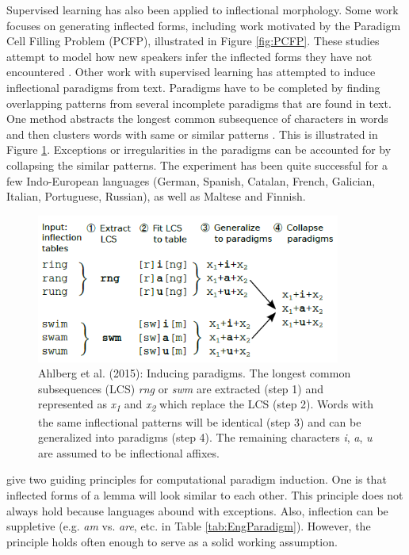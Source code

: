 Supervised learning has also been applied to inflectional morphology. Some work focuses on generating inflected forms, including work motivated by the Paradigm Cell Filling Problem (PCFP), illustrated in Figure \ref{fig:PCFP}. These studies attempt to model how new speakers infer the inflected forms they have not encountered \citep{dreyer_discovering_2011,ahlberg_paradigm_2015,malouf_generating_2016,silfverberg_encoder-decoder_2018}. Other work with supervised learning has attempted to induce inflectional paradigms from text. Paradigms have to be completed by finding overlapping patterns from several incomplete paradigms that are found in text. One method abstracts the longest common subsequence of characters in words and then clusters words with same or similar patterns  \citep{ahlberg_semi-supervised_2014,ahlberg_paradigm_2015}. This is illustrated in Figure \ref{fig:LCS}. Exceptions or irregularities in the paradigms can be accounted for by collapsing the similar patterns. The experiment has been quite successful for a few Indo-European languages (German, Spanish, Catalan, French, Galician, Italian, Portuguese, Russian), as well as Maltese and Finnish.

\begin{figure}[h]
\begin{center}
\includegraphics[width=10cm]{figs/Ahlberg2015-LCS.PNG}
\caption[Ahlberg et al. (2015)]{Ahlberg et al. (2015): Inducing paradigms. The longest common subsequences (LCS) \textit{rng} or \textit{swm} are extracted (step 1) and represented as \textit{x\textsubscript{1}} and \textit{x\textsubscript{2}} which replace the LCS (step 2). Words with the same inflectional patterns will be identical (step 3) and can be generalized into paradigms (step 4). The remaining characters \textit{i}, \textit{a}, \textit{u} are assumed to be inflectional affixes.}
\label{fig:LCS}
\end{center}
\end{figure}

\cite{monson_paramorfinding_2007b} give two guiding principles for computational paradigm induction. One is that inflected forms of a lemma will look similar to each other. This principle does not always hold because languages abound with exceptions. Also, inflection can be suppletive (e.g. \textit{am} vs. \textit{are}, etc. in Table \ref{tab:EngParadigm}). However, the principle holds often enough to serve as a solid working assumption.  


